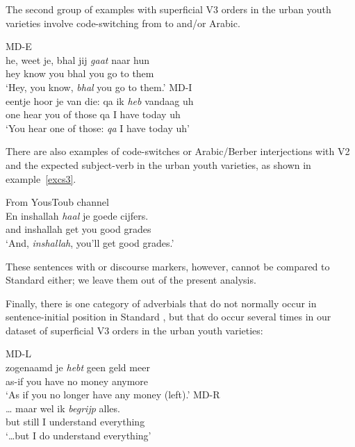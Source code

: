\documentclass[output=paper]{langsci/langscibook}
\begin{document}
The second group of examples with superficial V3 orders in the  urban
youth varieties involve code-switching from  to  and/or Arabic.

\ea
    \ea MD-E\\
    \gll he, weet je, bhal jij \textit{gaat} naar hun\\
    hey know you bhal you go to them\\
    \trans \enquote*{Hey, you know, \emph{bhal} you go to them.}
    \ex MD-I\\
    \gll eentje hoor je van die: qa ik \textit{heb} vandaag uh\\
    one hear you of those qa I have today uh\\
    \trans \enquote*{You hear one of those: \emph{qa} I have today uh}
    \z
\z

\noindent There are also examples of code-switches or Arabic/Berber
interjections with V2 and the expected subject-verb in the urban youth
varieties, as shown in example~\eqref{excs3}.

\ea From YousToub channel\\
    \gll\label{excs3}En inshallah \textit{haal} je goede cijfers.\\
    and inshallah get you good grades\\
    \trans \enquote*{And, \emph{inshallah}, you'll get good grades.}
\z

\noindent These sentences with  or  discourse markers,
however, cannot be compared to Standard  either; we leave them out
of the present analysis.

Finally, there is one category of adverbials that do not normally occur in
sen\-tence-initial position in Standard , but that do occur several
times in our dataset of superficial V3 orders in the
 urban youth varieties:

\ea
    \ea MD-L\\
    \gll zogenaamd je \textit{hebt} geen geld meer\\
    as-if you have no money anymore\\
    \trans \enquote*{As if you no longer have any money (left).}
    \ex MD-R\\
    \gll \dots{} maar wel ik \textit{begrijp} alles.\\
    {} but still I understand everything\\
    \trans \enquote*{\dots but I do understand everything}
    \z
\z
\end{document}

